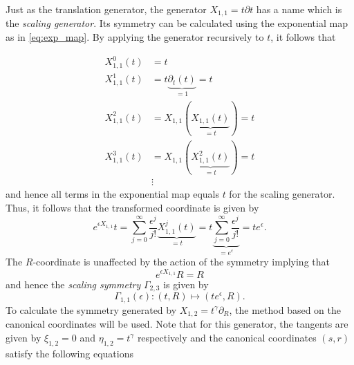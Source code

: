 Just as the translation generator, the generator $X_{1,1}=t\partial t$ has a name which is the \textit{scaling generator}. Its symmetry can be calculated using the exponential map as in \eqref{eq:exp_map}. By applying the generator recursively to $t$, it follows that

\begin{align*}
  X^{0}_{1,1}(t)&=t\\
  X^{1}_{1,1}(t)&=t\underset{=1}{\underbrace{\partial_t(t)}}=t\\
  X^{2}_{1,1}(t)&=X_{1,1}(\underset{=t}{\underbrace{X_{1,1}(t)}})=t\\
  X^{3}_{1,1}(t)&=X_{1,1}(\underset{=t}{\underbrace{X^{2}_{1,1}(t)}})=t\\  
  &\vdots
\end{align*}
and hence all terms in the exponential map equals $t$ for the scaling generator. Thus, it follows that the transformed coordinate is given by
$$e^{\epsilon X_{1,1}}t=\sum_{j=0}^{\infty}\frac{\epsilon^j}{j!}\underset{=t}{\underbrace{X_{1,1}^j(t)}}=t\underset{=e^{\epsilon}}{\underbrace{\sum_{j=0}^{\infty}\frac{\epsilon^j}{j!}}}=te^{\epsilon}.$$
The $R$-coordinate is unaffected by the action of the symmetry implying that
$$e^{\epsilon X_{1,1}}R=R$$
and hence the \textit{scaling symmetry} $\Gamma_{2,3}$ is given by
$$\Gamma_{1,1}(\epsilon):(t,R)\mapsto \left(te^{\epsilon},R\right).$$
To calculate the symmetry generated by $X_{1,2}=t^{\gamma}\partial_R$, the method based on the canonical coordinates will be used. Note that for this generator, the tangents are given by $\xi_{1,2}=0$ and $\eta_{1,2}=t^{\gamma}$ respectively and the canonical coordinates $(s,r)$ satisfy the following equations

